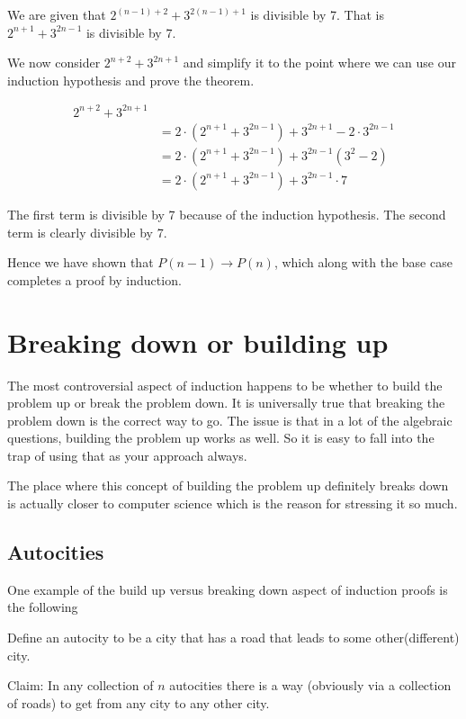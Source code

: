 \documentclass[12pt]{article}
\begin{document}
We are given that $2^{(n-1) + 2} + 3^{2(n-1)+1}$ is divisible by 7. That is $2^{n+1} + 3^{2n-1}$ is divisible by 7.

We now consider $2^{n+2} +3^{2n+1}$ and simplify it to the point where we can use our induction hypothesis and prove the theorem.

\begin{align*}
2^{n+2} + 3^{2n+1} \\
&= 2\cdot(2^{n+1} + 3^{2n-1}) + 3^{2n+1} - 2\cdot 3^{2n-1} \\
&= 2\cdot(2^{n+1} + 3^{2n-1}) + 3^{2n-1}(3^2 - 2) \\
&= 2\cdot(2^{n+1} + 3^{2n-1}) + 3^{2n-1}\cdot 7 
\end{align*}

The first term is divisible by 7 because of the induction hypothesis. The second term is clearly divisible by 7.

Hence we have shown that $P(n-1) \rightarrow P(n)$, which along with the base case completes a proof by induction.

\section*{Breaking down or building up}

The most controversial aspect of induction happens to be whether to build the problem up or break the problem down. It is universally true that breaking the problem down is the correct way to go. The issue is that in a lot of the algebraic questions, building the problem up works as well. So it is easy to fall into the trap of using that as your approach always. 

The place where this concept of building the problem up definitely breaks down is actually closer to computer science which is the reason for stressing it so much.

\subsection*{Autocities}

One example of the build up versus breaking down aspect of induction proofs is the following

Define an autocity to be a city that has a road that leads to some other(different) city. 

Claim: In any collection of $n$ autocities there is a way (obviously via a collection of roads) to get from any city to any other city.
\end{document}

